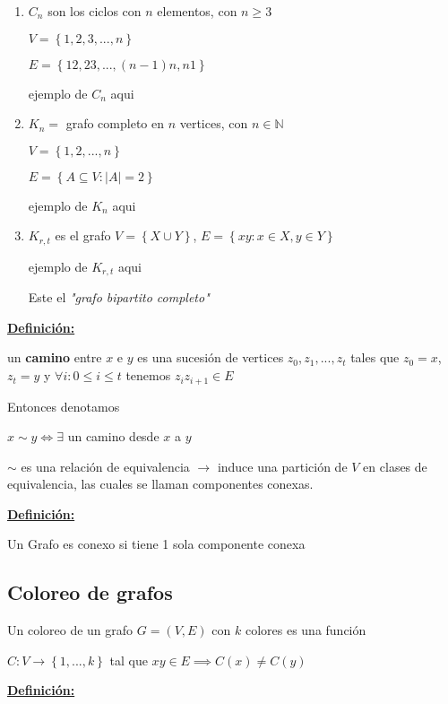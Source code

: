 \documentclass[12pt]{article}
\begin{document}
\begin{enumerate}
\item 

\(C_n\) son los ciclos con \(n\) elementos, con \(n \geq 3\)

\(V = \left\{1, 2, 3, ..., n\right\}\)

\(E = \left\{12, 23, ..., (n-1)n, n1\right\}\)

ejemplo de \(C_n\) aqui

\item
\(K_n = \) grafo completo en \(n\) vertices, con \(n \in \mathbb{N}\) 

\(V = \left\{1, 2, ..., n\right\}\)

\(E = \left\{A \subseteq V : |A| = 2\right\}\)

ejemplo de \(K_n\) aqui

\item
\(K_{r, t} \) es el grafo \(V = \left\{X \cup Y\right\}\), \(E = \left\{xy : x \in X, y \in Y\right\}\) 

ejemplo de \(K_{r, t}\) aqui

Este el \textit{"grafo bipartito completo"}
\end{enumerate}
\bigskip

\underline{\textbf{Definición:}}

un \textbf{camino} entre \(x\) e \(y\) es una sucesión de vertices \(z_0, z_1, ..., z_t\) tales que \(z_0 = x\), \(z_t = y\) y \(\forall i  : 0 \leq i \leq t\) tenemos  \(z_{i}z_{i+1} \in E\)

Entonces denotamos 

\(x \sim y \iff \exists\) un camino desde \(x\) a \(y\)

$\sim$ es una relación de equivalencia $\rightarrow$ induce una partición de $V$ en clases de equivalencia, las cuales se llaman componentes conexas. \bigskip

\underline{\textbf{Definición:}}

Un Grafo es conexo si tiene 1 sola componente conexa

\subsection*{Coloreo de grafos}

Un coloreo de un grafo $G = (V, E)$ con $k$ colores es una función 

\(C : V \rightarrow \left\{1, ..., k\right\}\) tal que \(xy \in E \implies C(x) \neq C(y)\) \bigskip

\underline{\textbf{Definición:}}
\end{document}
